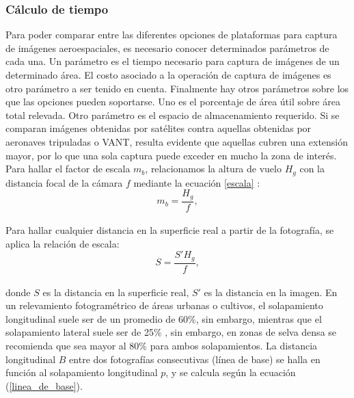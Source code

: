 \subsubsection{Cálculo de tiempo}
Para poder comparar entre las diferentes opciones de plataformas para captura de imágenes aeroespaciales, es necesario conocer determinados parámetros de cada una. Un parámetro es el tiempo necesario para captura de imágenes de un determinado área. El costo asociado a la operación de captura de imágenes es otro parámetro a ser tenido en cuenta. Finalmente hay otros parámetros sobre los que las opciones pueden soportarse. Uno es el porcentaje de área útil sobre área total relevada. Otro parámetro es el espacio de almacenamiento requerido.
Si se comparan imágenes obtenidas por satélites contra aquellas obtenidas por aeronaves tripuladas o VANT, resulta evidente que aquellas cubren una extensión mayor, por lo que una sola captura puede exceder en mucho la zona de interés. 
Para hallar el factor de escala $m_b$, relacionamos la altura de vuelo $H_g$ con la distancia focal
de la cámara $f$ mediante la ecuación \ref{escala} \cite{linder_digital_2016}:
\\
\begin{equation}
	m_b=\frac{H_g}{f},\label{escala}
\end{equation}
\\
Para hallar cualquier distancia en la superficie real a partir de la fotografía, se aplica la relación de escala:
\\
\begin{equation}
	S=\frac{S'H_g}{f},\label{escala1}
\end{equation}
\\
donde $S$ es la distancia en la superficie real, $S'$ es la distancia en la imagen.
En un relevamiento fotogramétrico de áreas urbanas o cultivos, el solapamiento longitudinal suele ser de un promedio de 60\%, sin embargo,  mientras que el solapamiento lateral suele ser de 25\% \cite{lopez_introduccion_nodate}, sin embargo, en zonas de selva densa se recomienda que sea mayor al 80\% para ambos solapamientos. La distancia longitudinal $B$ entre dos fotografías consecutivas (línea de base) se halla en función al solapamiento longitudinal $p$, y se calcula según la ecuación (\ref{linea_de_base}).
